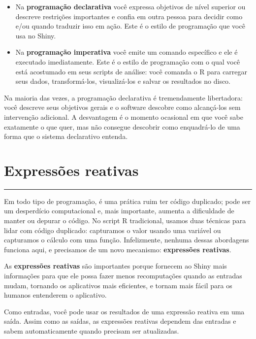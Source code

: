\documentclass[
]{book}
\begin{document}
\begin{itemize}
\item
  Na \textbf{programação declarativa} você expressa objetivos de nível superior ou descreve restrições importantes e confia em outra pessoa para decidir como e/ou quando traduzir isso em ação. Este é o estilo de programação que você usa no Shiny.
\item
  Na \textbf{programação imperativa} você emite um comando específico e ele é executado imediatamente. Este é o estilo de programação com o qual você está acostumado em seus scripts de análise: você comanda o R para carregar seus dados, transformá-los, visualizá-los e salvar os resultados no disco.
\end{itemize}

Na maioria das vezes, a programação declarativa é tremendamente libertadora: você descreve seus objetivos gerais e o software descobre como alcançá-los sem intervenção adicional. A desvantagem é o momento ocasional em que você sabe exatamente o que quer, mas não consegue descobrir como enquadrá-lo de uma forma que o sistema declarativo entenda.

\hypertarget{expressuxf5es-reativas}{%
\chapter{\texorpdfstring{\textbf{Expressões reativas}}{Expressões reativas}}\label{expressuxf5es-reativas}}

\begin{center}\rule{0.5\linewidth}{0.5pt}\end{center}

Em todo tipo de programação, é uma prática ruim ter código duplicado; pode ser um desperdício computacional e, mais importante, aumenta a dificuldade de manter ou depurar o código. No script R tradicional, usamos duas técnicas para lidar com código duplicado: capturamos o valor usando uma variável ou capturamos o cálculo com uma função. Infelizmente, nenhuma dessas abordagens funciona aqui, e precisamos de um novo mecanismo: \textbf{expressões reativas}.

As \textbf{expressões reativas} são importantes porque fornecem ao Shiny mais informações para que ele possa fazer menos recomputações quando as entradas mudam, tornando os aplicativos mais eficientes, e tornam mais fácil para os humanos entenderem o aplicativo.

Como entradas, você pode usar os resultados de uma expressão reativa em uma saída. Assim como as saídas, as expressões reativas dependem das entradas e sabem automaticamente quando precisam ser atualizadas.
\end{document}
